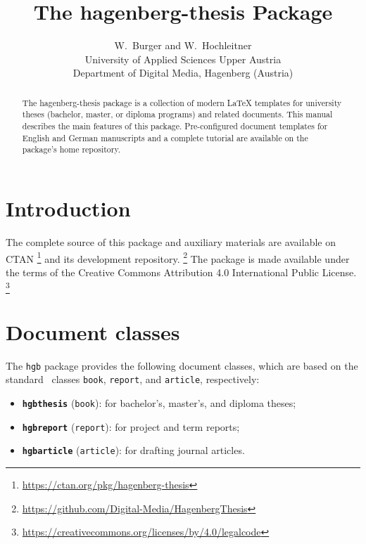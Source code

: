 \documentclass[english]{hgbarticle}
\begin{document}

\title{The \textsf{hagenberg-thesis} Package}
\date{\hgbDate}

\author{W.\ Burger and W.\ Hochleitner\\[10pt]
University of Applied Sciences Upper Austria\\
Department of Digital Media, Hagenberg (Austria)}

\maketitle

\begin{abstract}\noindent
The \textsf{hagenberg-thesis} package is a collection of modern LaTeX
templates for university theses (bachelor, master, or diploma programs) and
related documents. This manual describes the main features of this package.
Pre-configured document templates for English and German manuscripts and a
complete tutorial are available on the package's home repository.
\end{abstract}

\clearpage
\tableofcontents
\clearpage

\section{Introduction}

The complete source of this package and auxiliary materials are available on
CTAN%
\footnote{\url{https://ctan.org/pkg/hagenberg-thesis}}
and its development repository.%
\footnote{\url{https://github.com/Digital-Media/HagenbergThesis}}
The package is made available under the terms of the Creative Commons
Attribution 4.0 International Public License.%
\footnote{\url{https://creativecommons.org/licenses/by/4.0/legalcode}}


\section{Document classes}

The \texttt{hgb} package provides the following document classes, which are
based on the standard \latex\ classes \texttt{book}, \texttt{report}, and
\texttt{article}, respectively:
%
\begin{itemize}
    \item \textbf{\texttt{hgbthesis}} (\texttt{book}):
    for bachelor's, master's, and diploma theses;
    \item \textbf{\texttt{hgbreport}} (\texttt{report}):
    for project and term reports;
    \item \textbf{\texttt{hgbarticle}} (\texttt{article}):
    for drafting journal articles.
\end{itemize}
\end{document}
